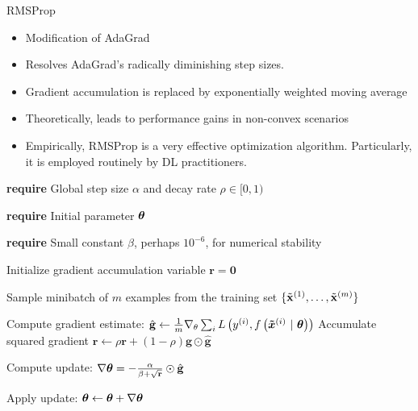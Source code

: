 \documentclass[11pt,compress,t,notes=noshow, xcolor=table]{beamer}
\begin{document}

\begin{vbframe}{RMSProp}
	\begin{itemize}
		\item Modification of AdaGrad
		\item Resolves AdaGrad's radically diminishing step sizes.
		\item Gradient accumulation is replaced by exponentially weighted moving average
		\item Theoretically, leads to performance gains in non-convex scenarios
		\item Empirically, RMSProp is a very effective optimization algorithm.
            Particularly, it is employed routinely by DL practitioners.
	\end{itemize}
	
	\framebreak
	
	
	\begin{algorithm}[H]
		\small
		\caption{RMSProp}
		\begin{algorithmic}[1]
			\State \textbf{require} Global step size $\alpha$ and decay rate $\rho \in [0, 1)$ \strut
			\State \textbf{require} Initial parameter $\mathbf{\bm{\theta}}$ \strut
			\State \parbox[t]{\dimexpr\linewidth-\algorithmicindent}{\textbf{require} Small constant $\beta$, perhaps $10^{-6}$, for numerical stability \strut}
			\State Initialize gradient accumulation variable $\mathbf{r} = \mathbf{0} $
			\State \parbox[t]{\dimexpr\linewidth-\algorithmicindent}{Sample minibatch of $m$ examples from the training set $\{\tilde{\mathbf{x}}^{(1)},\dots,\tilde{\mathbf{x}}^{(m)}\}$ \strut}
			\State Compute gradient estimate: $\hat{\mathbf{g}} \leftarrow \frac{1}{m} \nabla_\theta \sum_{i} L\left(y^{(i)}, f\left(\bm{\tilde{x}}^{(i)} ~|~ \bm{\theta}\right)\right)$
			\State Accumulate squared gradient $\mathbf{r} \leftarrow \rho \mathbf{r} + (1 - \rho) \hat{\mathbf{g}} \odot  \hat{\mathbf{g}}$
			\State \parbox[t]{\dimexpr\linewidth-\algorithmicindent}{Compute update: $\nabla\mathbf{\bm{\theta}} = - \frac{\alpha}{\beta + \sqrt\mathbf{r}} \odot \hat{\mathbf{g}}$ \strut}
			\State Apply update: $\mathbf{\bm{\theta}} \leftarrow \mathbf{\bm{\theta}} + \nabla\mathbf{\bm{\theta}}$
			\EndWhile
		\end{algorithmic}
	\end{algorithm}
\end{vbframe}
\end{document}

